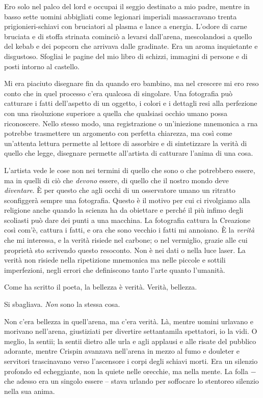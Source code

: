 Ero solo nel palco del lord e occupai il seggio destinato a mio padre,
mentre in basso sette uomini abbigliati come legionari imperiali
massacravano trenta prigionieri-schiavi con bruciatori al plasma e lance
a energia. L'odore di carne bruciata e di stoffa strinata cominciò a
levarsi dall'arena, mescolandosi a quello del kebab e dei popcorn che
arrivava dalle gradinate. Era un aroma inquietante e disgustoso.
Sfogliai le pagine del mio libro di schizzi, immagini di persone e di
posti intorno al castello.

Mi era piaciuto disegnare fin da quando ero bambino, ma nel crescere mi
ero reso conto che in quel processo c'era qualcosa di singolare. Una
fotografia può catturare i fatti dell'aspetto di un oggetto, i colori e
i dettagli resi alla perfezione con una risoluzione superiore a quella
che qualsiasi occhio umano possa riconoscere. Nello stesso modo, una
registrazione o un'iniezione mnemonica a rna potrebbe trasmettere un
argomento con perfetta chiarezza, ma così come un'attenta lettura
permette al lettore di assorbire e di sintetizzare la verità di quello
che legge, disegnare permette all'artista di catturare l'anima di una
cosa.

L'artista vede le cose non nei termini di quello che sono o che
potrebbero essere, ma in quelli di ciò che \emph{devono} essere, di
quello che il nostro mondo deve \emph{diventare}. È per questo che agli
occhi di un osservatore umano un ritratto sconfiggerà sempre una
fotografia. Questo è il motivo per cui ci rivolgiamo alla religione
anche quando la scienza ha da obiettare e perché il più infimo degli
scoliasti può dare dei punti a una macchina. La fotografia cattura la
Creazione così com'è, cattura i fatti, e ora che sono vecchio i fatti mi
annoiano. È la \emph{verità} che mi interessa, e la verità risiede nel
carbone; o nel vermiglio, grazie alle cui proprietà sto scrivendo questo
resoconto. Non è nei dati o nella luce laser. La verità non risiede
nella ripetizione mnemonica ma nelle piccole e sottili imperfezioni,
negli errori che definiscono tanto l'arte quanto l'umanità.

Come ha scritto il poeta, la bellezza è verità. Verità, bellezza.

Si sbagliava. \emph{Non} sono la stessa cosa.

Non c'era bellezza in quell'arena, ma c'era verità. Là, mentre uomini
urlavano e morivano nell'arena, giustiziati per divertire settantamila
spettatori, io la vidi. O meglio, la sentii; la sentii dietro alle urla
e agli applausi e alle risate del pubblico adorante, mentre Crispin
avanzava nell'arena in mezzo al fumo e douleter e servitori trascinavano
verso l'ascensore i corpi degli schiavi morti. Era un silenzio profondo
ed echeggiante, non la quiete nelle orecchie, ma nella mente. La folla −
che adesso era un singolo essere -- stava urlando per soffocare lo
stentoreo silenzio nella sua anima.

